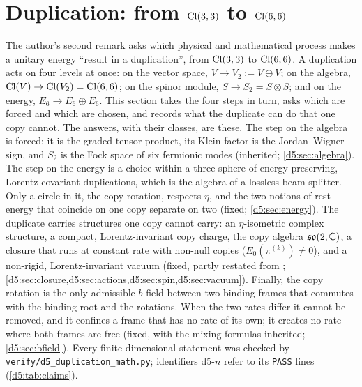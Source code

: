 \section{\texorpdfstring{Duplication: from $\mathrm{Cl}(3,3)$ to $\mathrm{Cl}(6,6)$}{Duplication: from Cl(3,3) to Cl(6,6)}}
\label{d5:sec:main}

The author's second remark asks which physical and mathematical process makes a unitary energy ``result in a duplication'', from
$\mathrm{Cl}(3,3)$ to $\mathrm{Cl}(6,6)$. A duplication acts on four levels at once: on the vector space, $V\to V_2:=V\oplus V$; on the algebra,
$\mathrm{Cl}(V)\to\mathrm{Cl}(V_2)=\mathrm{Cl}(6,6)$; on the spinor module, $S\to S_2=S\otimes S$; and on the energy, $E_6\to E_6\oplus E_6$. This section takes
the four steps in turn, asks which are forced and which are chosen, and records what the duplicate can do that one copy cannot. The
answers, with their classes, are these. The step on the algebra is forced: it is the graded tensor product, its Klein factor is the
Jordan--Wigner sign, and $S_2$ is the Fock space of six fermionic modes (inherited; \cref{d5:sec:algebra}). The step on the energy is a
choice within a three-sphere of energy-preserving, Lorentz-covariant duplications, which is the algebra of a lossless beam splitter. Only a
circle in it, the copy rotation, respects $\eta$, and the two notions of rest energy that coincide on one copy separate on two (fixed;
\cref{d5:sec:energy}). The duplicate carries structures one copy cannot carry: an $\eta$-isometric complex structure, a compact,
Lorentz-invariant copy charge, the copy algebra $\mathfrak{so}(2,\mathbb{C})$, a closure that runs at constant rate with non-null copies ($E_0(\pi^{(k)})\neq0$), and a non-rigid,
Lorentz-invariant vacuum (fixed, partly restated from \cite{ES17}; \cref{d5:sec:closure,d5:sec:actions,d5:sec:spin,d5:sec:vacuum}). Finally, the
copy rotation is the only admissible $b$-field between two binding frames that commutes with the binding root and the rotations. When
the two rates differ it cannot be removed, and it confines a frame that has no rate of its own; it creates no rate where both frames
are free (fixed, with the mixing formulas inherited; \cref{d5:sec:bfield}). Every finite-dimensional statement was checked by
\texttt{verify/d5\_duplication\_math.py}; identifiers d5-$n$ refer to its \texttt{PASS} lines (\cref{d5:tab:claims}).

